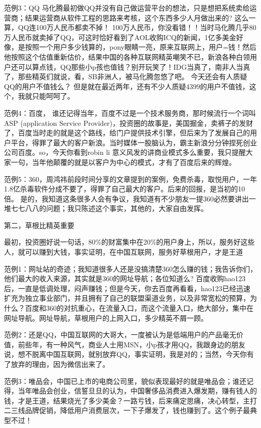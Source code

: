     范例3：QQ 马化腾最初做QQ并没有自己做运营平台的想法，只是想把系统卖给运营商；结果运营商从软件工程的思路来考核，这个东西多少人月做出来的? 这么一算，QQ连100万人民币都卖不掉！ 100万人民币，你没看错！！当时马化腾几乎80万人民币就卖掉了QQ，可这时恰好看到了AOL收购ICQ的新闻，1亿多美金好像，是按照一个用户多少钱算的，pony眼睛一亮，原来互联网上，用户=钱！然后他按照这个估值重新估价，结果中国的各种互联网精英嘲笑不已，新浪各种白领用户还可以算点钱，QQ那些小p孩也值钱？别开玩笑了！IDG当真了，南非人当真了，那些精英们就说，看，SB非洲人，被马化腾忽悠了吧。 今天还会有人质疑QQ的用户不值钱么？ 但是就在最近两年，还有不少人质疑4399的用户不值钱，这个，我就只能呵呵了。

    范例4：百度， 谁还记得当年，百度不过是一个技术服务商，那时候流行一个词叫ASP (application Service Provider)，投资圈的故事是，美国掘金，卖裤子的发财了，百度当时走的就是这个路线，给门户提供技术引擎，但后来为了发展自己的用户平台，得罪了最大的客户新浪。当时媒体一股脑认为，霸主新浪分分钟捏死创业公司百度。so，今天你看到robin li 意义风发的讲商业模式多么重要，我只提醒大家一句，当年他颠覆的就是以客户为中心的模式，才有了百度后来的辉煌。

    范例5：360，周鸿祎前段时间分享的文章提到的案例，免费杀毒，取悦用户，一年1.8亿杀毒软件分成不要了，得罪了自己最大的客户。后来的回报，是当初的10倍。 是的，我知道这条很多人会有争议，我知道有不少朋友一提360必然要讲出一堆七七八八的问题；我只陈述这个事实，其他的，大家自由发挥。


第二，草根比精英重要

       最初，投资圈好说一句话，80\%的财富集中在20\%的用户身上，所以，服务好这些人，就可以赚到大钱，事实证明，在中国互联网，服务好草根用户，才是王道

    范例1：网址站的奇迹；我知道很多人还是没搞清楚360怎么赚的钱；我告诉你们，他们最大的收入来源，其实就是360的网址导航；各位知道么? 百度收购hao123后，一直是低调处理，闷声赚钱；但是今天，你去百度再看看，hao123已经迅速扩充为独立事业部门，并且拥有了自己的联盟渠道业务，以及非常宽松的预算，为什么？百度和360的对抗重心，在流量入口，而这个流量入口，绝大部分，集中在网址导航。网址导航，草根用户的上网入口，多少精英不屑一顾。

    范例2：还是QQ，中国互联网的大哥大，一度被认为是低端用户的产品毫无价值，前些年，有一种风气，商业人士用MSN，小p孩才用QQ，我跟身边的朋友说，想不脱离中国互联网，就别放弃QQ，事实证明，我是对的；当然，今天你有了放弃的理由，因为微信出来了。

    范例3：唯品会，中国已上市的电商公司里，貌似表现最好的就是唯品会；谁还记得，当年唯品会创业，信誓旦旦的认为，中国奢侈品消费进入爆发期，赚有钱人的钱，才是王道，结果烧光了多少美金？一路亏钱，后来痛定思痛，决心转型，主打二三线品牌促销，降低用户消费层次，一下子爆发了，钱也赚到了。这个例子最典型不过！

